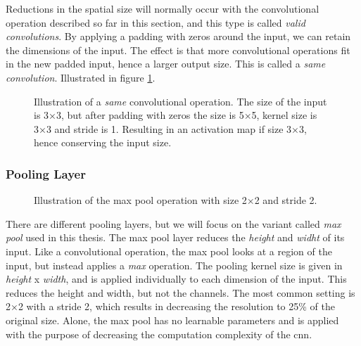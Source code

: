     Reductions in the spatial size\cite{o2015introduction_convolutions} will normally occur with the convolutional operation described so far in this section, and this type is called \textit{valid convolutions}. By applying a padding with zeros around the input, we can retain the dimensions of the input. The effect is that more convolutional operations fit in the new padded input, hence a larger output size. This is called a \textit{same convolution}. Illustrated in figure \ref{same_convolutional_fig}.
    
    \begin{figure}[H]
        \centering
        
        \caption[Same convolution example]{Illustration of a \textit{same} convolutional operation. The size of the input is 3×3, but after padding with zeros the size is 5×5, kernel size is 3×3 and stride is 1. Resulting in an activation map if size 3×3, hence conserving the input size.}
      	\medskip 
        \label{same_convolutional_fig}
    \end{figure}
    
    
    
\subsubsection{Pooling Layer}

    \begin{figure}[H]
        \centering
                
        \caption[The max pool operation]{Illustration of the max pool operation with size 2×2 and stride 2.}
      	\medskip 
        \label{maxpool_fig}
    \end{figure}
    There are different pooling layers, but we will focus on the variant called \textit{max pool} used in this thesis. The max pool layer reduces the \textit{height} and \textit{widht} of its input\cite{o2015introduction_convolutions}. Like a convolutional operation, the max pool looks at a region of the input, but instead applies a \textit{max} operation. The pooling kernel size is given in \textit{height} x \textit{width}, and is applied individually to each dimension of the input. This reduces the height and width, but not the channels. The most common setting is 2×2 with a stride 2, which results in decreasing the resolution to 25\% of the original size. Alone, the max pool has no learnable parameters and is applied with the purpose of decreasing the computation complexity of the \gls{cnn}.



